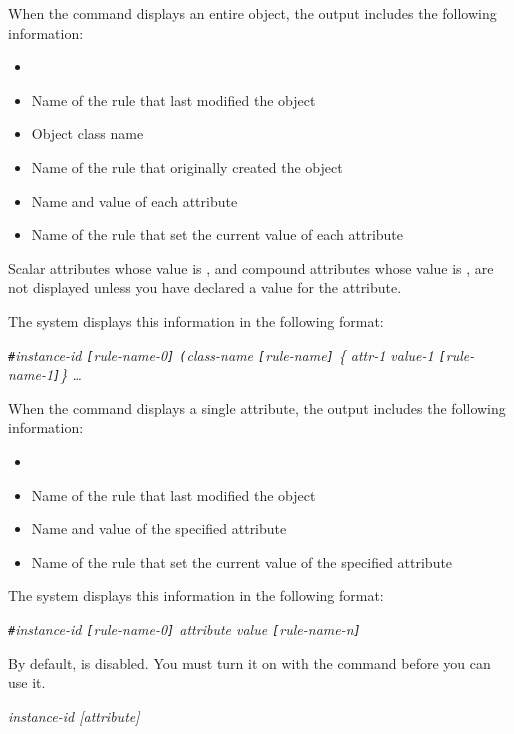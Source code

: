 {{When the  command displays an entire object, the
output includes the following information:
\begin{itemize}
\item {}
\item Name of the rule that last modified the object
\item Object class name
\item Name of the rule that originally created the object
\item Name and value of each attribute
\item Name of the rule that set the current value of each attribute
\end{itemize}

Scalar attributes whose value is , and compound attributes whose
value is , are not displayed unless you have declared a
 value for the attribute.

The system displays this information in the following format:

\verb|#|\it{instance-id} \verb|[|\it{rule-name-0}\verb|]| \verb|(|\it{class-name} \verb|[|rule-name\verb|]| \{ \ct\it{attr-1} \it{value-1} \verb|[|\it{rule-name-1}\verb|]|\} \ldots

When the  command displays a single attribute, the
output includes the following information:

\begin{itemize}
\item {}
\item Name of the rule that last modified the object
\item Name and value of the specified attribute
\item Name of the rule that set the current value of the specified
  attribute
\end{itemize}

The system displays this information in the following format:

\verb|#|\it{instance-id} \verb|[|\it{rule-name-0}\verb|]| \ct\it{attribute} \it{value} \verb|[|\it{rule-name-n}\verb|]|

\begin{note}
  By default,  is disabled. You must turn it on with the
   command before you can use it.
\end{note}

\Format

 \it{instance-id} [\ct\it{attribute}]

}}
